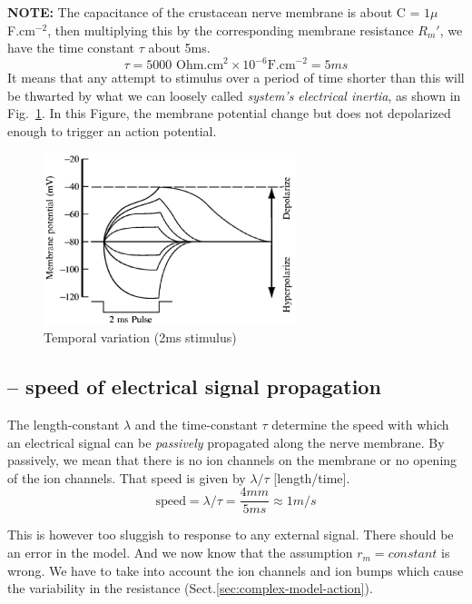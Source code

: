 {\bf NOTE:} The capacitance of the crustacean nerve membrane is about
C = $1\mu $F.cm$^{-2}$, then multiplying this by the corresponding membrane
resistance $R_m'$, we have the time constant $\tau$ about 5ms. 
\begin{equation}
  \tau = 5000 \text{ Ohm.cm}^2 \times 10^{-6} \text{F.cm}^{-2} = 5ms
\end{equation}
It means that any attempt to stimulus over a period of time shorter
than this will be thwarted by what we can loosely called
{\it system's electrical inertia}, as shown in Fig.~\ref{fig:V-tv}. In
this Figure, the membrane potential change but does not depolarized
enough to trigger an action potential.
\begin{figure}[htb]
\centerline{\includegraphics[height=5cm]{./images/V-temporal_variation.eps}}
\caption{Temporal variation (2ms stimulus)}\label{fig:V-tv}
\end{figure} 

\subsection{-- speed of electrical signal propagation}

The length-constant $\lambda$ and the time-constant $\tau$ determine the speed
with which an electrical signal can be {\it passively} propagated along the
nerve membrane. By passively, we mean that there is no ion channels on
the membrane or no opening of the ion channels. That speed is given by
$\lambda/\tau$ [length/time].
\begin{equation}
  \text{speed} = \lambda/\tau = \frac{4mm}{5ms} \approx 1m/s
\end{equation}

This is however too sluggish to response to any external signal. There should
be an error in the model. And we now know that the assumption 
$r_m =constant$ is wrong. We have to take into account the ion channels and
ion bumps which cause the variability in the resistance
(Sect.\ref{sec:complex-model-action}).


